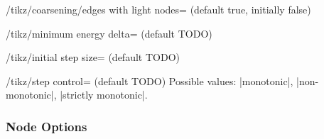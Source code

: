 \begin{key}{/tikz/coarsening/edges with light nodes=
  (default true, initially false)}
  \begin{codeexample}[]
  \end{codeexample}
\end{key}

\begin{key}{/tikz/minimum energy delta= (default TODO)}
  \begin{codeexample}[]
  \end{codeexample}
\end{key}

\begin{key}{/tikz/initial step size= (default TODO)}
  \begin{codeexample}[]
  \end{codeexample}
\end{key}

\begin{key}{/tikz/step control= (default TODO)}
  Possible values: |monotonic|, |non-monotonic|, |strictly monotonic|.
  \begin{codeexample}[]
  \end{codeexample}
\end{key}

\subsubsection{Node Options}


